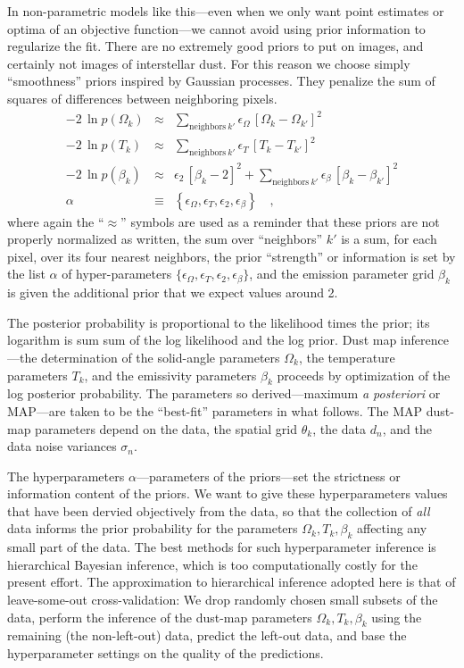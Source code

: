 \documentclass[12pt,pdftex,preprint]{aastex}
\newcommand{\foreign}[1]{\textit{#1}}
\begin{document}
In non-parametric models like this---even when we only want point
estimates or optima of an objective function---we cannot avoid using
prior information to regularize the fit.  There are no extremely good
priors to put on images, and certainly not images of interstellar
dust.  For this reason we choose simply ``smoothness'' priors inspired
by Gaussian processes.  They penalize the sum of squares of
differences between neighboring pixels.
\begin{eqnarray}\displaystyle
-2\,\ln p(\Omega_k) &\approx& \sum_{\mathrm{neighbors}~k'} \epsilon_\Omega\,\left[\Omega_k - \Omega_{k'}\right]^2
\\
-2\,\ln p(T_k) &\approx& \sum_{\mathrm{neighbors}~k'} \epsilon_T\,\left[T_k - T_{k'}\right]^2
\\
-2\,\ln p(\beta_k) &\approx& \epsilon_2\,\left[\beta_k - 2\right]^2
                    + \sum_{\mathrm{neighbors}~k'} \epsilon_\beta\,\left[\beta_k - \beta_{k'}\right]^2
\\
\alpha &\equiv& \left\{\epsilon_\Omega, \epsilon_T, \epsilon_2, \epsilon_\beta\right\}
\quad ,
\end{eqnarray}
where again the ``$\approx$'' symbols are used as a reminder that
these priors are not properly normalized as written, the sum over
``neighbors'' $k'$ is a sum, for each pixel, over its four nearest
neighbors, the prior ``strength'' or information is set by the list
$\alpha$ of hyper-parameters $\{\epsilon_\Omega, \epsilon_T,
\epsilon_2, \epsilon_\beta\}$, and the emission parameter grid
$\beta_k$ is given the additional prior that we expect values around
2.

The posterior probability is proportional to the likelihood times the
prior; its logarithm is sum sum of the log likelihood and the log
prior.  Dust map inference---the determination of the solid-angle
parameters $\Omega_k$, the temperature parameters $T_k$, and the
emissivity parameters $\beta_k$ proceeds by optimization of the log
posterior probability.  The parameters so derived---maximum \foreign{a
  posteriori} or MAP---are taken to be the ``best-fit'' parameters in
what follows.  The MAP dust-map parameters depend on the data, the
spatial grid $\theta_k$, the data $d_n$, and the data noise variances
$\sigma_n$.

The hyperparameters $\alpha$---parameters of the priors---set the
strictness or information content of the priors.  We want to give
these hyperparameters values that have been dervied objectively from
the data, so that the collection of \emph{all} data informs the prior
probability for the parameters $\Omega_k, T_k, \beta_k$ affecting any
small part of the data.  The best methods for such hyperparameter
inference is hierarchical Bayesian inference, which is too
computationally costly for the present effort.  The approximation to
hierarchical inference adopted here is that of leave-some-out
cross-validation: We drop randomly chosen small subsets of the data,
perform the inference of the dust-map parameters $\Omega_k, T_k,
\beta_k$ using the remaining (the non-left-out) data, predict the
left-out data, and base the hyperparameter settings on the quality of
the predictions.
\end{document}
